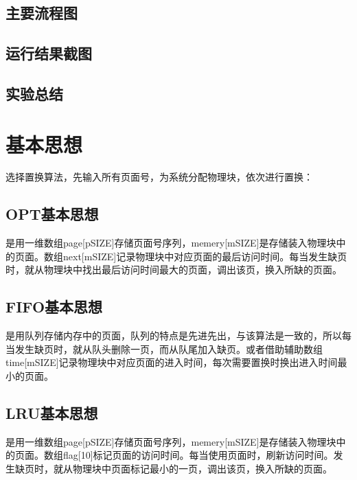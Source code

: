 \documentclass[a4paper,UTF8,heading=false,12pt]{article}
\begin{document}
\subsection{主要流程图}

\subsection{运行结果截图}

\subsection{实验总结}

\section{基本思想}

选择置换算法，先输入所有页面号，为系统分配物理块，依次进行置换：

\subsection{OPT基本思想}

是用一维数组page[pSIZE]存储页面号序列，memery[mSIZE]是存储装入物理块中的页面。数组next[mSIZE]记录物理块中对应页面的最后访问时间。每当发生缺页时，就从物理块中找出最后访问时间最大的页面，调出该页，换入所缺的页面。

\subsection{FIFO基本思想}

是用队列存储内存中的页面，队列的特点是先进先出，与该算法是一致的，所以每当发生缺页时，就从队头删除一页，而从队尾加入缺页。或者借助辅助数组time[mSIZE]记录物理块中对应页面的进入时间，每次需要置换时换出进入时间最小的页面。

\subsection{LRU基本思想}

是用一维数组page[pSIZE]存储页面号序列，memery[mSIZE]是存储装入物理块中的页面。数组flag[10]标记页面的访问时间。每当使用页面时，刷新访问时间。发生缺页时，就从物理块中页面标记最小的一页，调出该页，换入所缺的页面。
\end{document}
